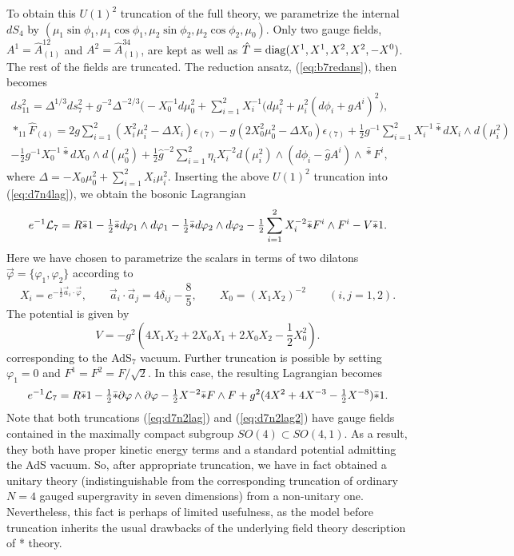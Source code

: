 \documentclass[a4paper,12pt]{article}
\newcommand{\fft}[2]{{\frac{#1}{#2}}}
\newcommand{\ft}[2]{{\textstyle\frac{#1}{#2}}}
\begin{document}
To obtain this $U(1)^2$ truncation of the full theory, we parametrize
the internal $dS_4$ by $(\mu_1\sin{\phi_1},\mu_1\cos{\phi_1},
\mu_2\sin{\phi_2},\mu_2\cos{\phi_2},\mu_0)$.  Only two gauge fields,
$A^1=\hat A_{(1)}^{12}$ and $A^2=\hat A_{(1)}^{34}$, are kept as well as 
$\hat T={\rm diag}(X^1, X^1, X^2, X^2, -X^0)$.  The rest of the fields are
truncated.  The reduction ansatz, (\ref{eq:b7redans}), then becomes 
%
\begin{eqnarray}
ds_{11}^2=\Delta^{1/3}ds_7^2+g^{-2}\Delta^{-2/3}\bigl(-X_0^{-1}d\mu_0^2+
\sum_{i=1}^2
X_i^{-1}\bigl(d\mu_i^2+\mu_i^2(d\phi_i+g A^i)^2),\nonumber\\
\ast_{11} \hat F_{(4)}= 2 g\sum_{i=1}^2(X_i^2\mu_i^2-\Delta
X_i)\epsilon_{(7)}-g(2X_0^2\mu_0^2-\Delta X_0)\epsilon_{(7)} 
+\fft12 g^{-1}\sum_{i=1}^2 X_i^{-1}\bar *dX_i\wedge d(\mu_i^2)\nonumber\\
-\fft12 g^{-1}X_0^{-1}\bar\ast dX_0\wedge d(\mu_0^2)
+\fft12\hat g^{-2}\sum_{i=1}^2 \eta_iX_i^{-2}d(\mu_i^2)\wedge
(d\phi_i-\hat gA^i)\wedge\bar *F^i,\quad
\end{eqnarray}
%
where $\Delta=-X_0\mu_0^2+\sum_{i=1}^2X_i\mu_i^2$.  
Inserting the above $U(1)^2$ truncation into (\ref{eq:d7n4lag}), we
obtain the bosonic Lagrangian
%
\begin{equation}
e^{-1}{\cal L}_7 = R\bar *1-\ft12\bar*d\varphi_1\wedge d\varphi_1
-\ft12\bar*d\varphi_2\wedge d\varphi_2 
-\ft12\sum_{i=1}^2 X_i^{-2}\bar*F^i\wedge F^i-V\bar*1.
\label{eq:d7n2lag}
\end{equation}
%
Here we have chosen to parametrize the scalars in terms of two dilatons
$\vec\varphi=\{\varphi_1,\varphi_2\}$ according to
%
\begin{equation}
X_i=e^{-\fft12\vec a_i\cdot\vec\varphi},\qquad
\vec a_i\cdot\vec a_j=4\delta_{ij}-\fft{8}{5},\qquad
X_0=(X_1X_2)^{-2} \qquad(i,j=1,2).
\end{equation}
%
The potential is given by 
%
\begin{equation}
V = -g^2(4X_1X_2+2X_0X_1+2X_0X_2-\fft12 X_0^2).
\end{equation}
%
corresponding to the AdS$_7$ vacuum.  Further truncation is possible by
setting $\varphi_1=0$ and $F^1=F^2=F/\sqrt{2}$. In this case, the
resulting Lagrangian becomes 
%
\begin{equation}
e^{-1}{\cal L}_7 = R\bar *1 -\ft12 \bar*\partial\varphi\wedge\partial\varphi
-\ft12 X^{-2}\bar *F\wedge F+g^2(4X^2+4X^{-3}-\ft12 X^{-8})\bar*1.
\label{eq:d7n2lag2}
\end{equation}
%
Note that both truncations (\ref{eq:d7n2lag}) and (\ref{eq:d7n2lag2})
have gauge fields contained in the maximally compact subgroup
$SO(4)\subset SO(4,1)$.  As a result, they both have proper kinetic
energy terms and a standard potential admitting the AdS vacuum.  So,
after appropriate truncation, we have in fact obtained a unitary theory
(indistinguishable from the corresponding truncation of ordinary
$N=4$ gauged supergravity in seven dimensions) from a non-unitary one.
Nevertheless, this fact is perhaps of limited usefulness, as the
model before truncation inherits the usual drawbacks of the
underlying field theory description of * theory.
\end{document}

